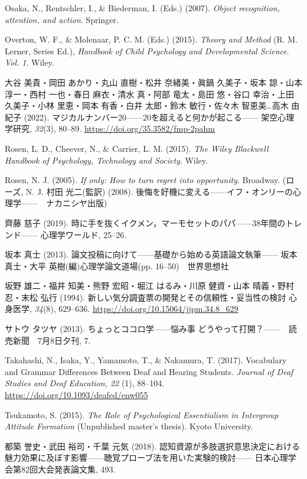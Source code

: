 Osaka, N., Rentschler, I., \& Biederman, I. (Eds.)  (2007). \textit{Object recognition, attention, and action}. Springer.

Overton, W. F., \& Molenaar, P. C. M. (Eds.)  (2015). \textit{Theory and Method} (R. M. Lerner, Series Ed.), \textit{Handbook of Child Psychology and Developmental Science}. \textit{Vol. 1}. Wiley.

大谷 美貴・岡田 あかり・丸山 直樹・松井 奈緒美・眞鍋 久美子・坂本 諒・山本 淳一・西村 一也・春日 麻衣・清水 真・阿部 竜太・島田 悠・谷口 幸治・上田 久美子・小林 里恵・岡本 有香・白井 太郎・鈴木 敏行・佐々木 智恵美{\ldots}高木 由紀子 (2022). マジカルナンバー20------20を超えると何かが起こる------ 架空心理学研究, \textit{32}(3), 80--89. \url{https://doi.org/35.3582/fmp-2pahm}

Rosen, L. D., Cheever, N., \& Carrier, L. M. (2015). \textit{The Wiley Blackwell Handbook of Psychology, Technology and Society}. Wiley.

Rosen, N. J. (2005). \textit{If only: How to turn regret into opportunity}. Broadway.
(ローズ, N. J. 村田 光二(監訳) (2008). 後悔を好機に変える------イフ・オンリーの心理学------　ナカニシヤ出版)

齊藤 慈子 (2019). 時に手を抜くイクメン，マーモセットのパパ------38年間のトレンド------ 心理学ワールド, 25--26.

坂本 真士 (2013). 論文投稿に向けて------基礎から始める英語論文執筆------ 坂本 真士・大平 英樹(編)心理学論文道場(pp. 16--50)　世界思想社

坂野 雄二・福井 知美・熊野 宏昭・堀江 はるみ・川原 健資・山本 晴義・野村 忍・末松 弘行 (1994). 新しい気分調査票の開発とその信頼性・妥当性の検討 心身医学, \textit{34}(8), 629--636. \url{https://doi.org/10.15064/jjpm.34.8_629}

サトウ タツヤ (2013). ちょっとココロ学------悩み事 どうやって打開？------　読売新聞　7月8日夕刊, 7.

Takahashi, N., Isaka, Y., Yamamoto, T., \& Nakamura, T. (2017). Vocabulary and Grammar Differences Between Deaf and Hearing Students. \textit{Journal of Deaf Studies and Deaf Education, 22} (1), 88--104. \url{https://doi.org/10.1093/deafed/enw055}

Tsukamoto, S. (2015). \textit{The Role of Psychological Essentialism in Intergroup Attitude Formation} (Unpublished master's thesis). Kyoto University.

都築 誉史・武田 裕司・千葉 元気 (2018). 認知資源が多肢選択意思決定における魅力効果に及ぼす影響------聴覚プローブ法を用いた実験的検討------ 日本心理学会第82回大会発表論文集, 493.

